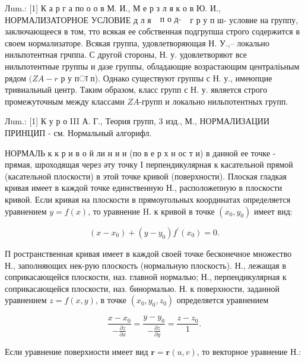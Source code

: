 \documentclass[10pt]{article}
\begin{document}
Лum.: [1] К а р г а по о о в М. И., М е р з л я к о в Ю. И., НОРМАЛИЗАТОРНОЕ УСЛОВИЕ д л я $\begin{array}{r}\text { п } о \text { д- }\end{array}$ г р у п ш- условие на группу, заключающееся в том, тто всякая ее собственная подгрупша строго содержится в своем нормализаторе. Всякая группа, удовлетворяющая Н. У.,-- локально нильпотентная грчппа. С другой стороны, Н. у. удовлетворяют все нильпотентные группы и дазе группы, обладающие возрастающим централіьным рядом $(Z A-r$ р у пा п). Однако существуют группы с Н. у., имеюпцие тривиальный центр. Таким образом, класс групп с Н. у. является строго промежуточным между классами $Z A$-групп и локально нильпотентных групп.



Лum.: [1] К у р о III А. Г., Теория групп, 3 изд., М., НОРМАЛИЗАЦИИ ПРИНЦИП - см. Нормальный алгорифл.



НОРМАЛЬ к к р и в о й ли н и и (по в е р х н ос т и) в данной ее точке - прямая, шроходящая через әту точку І перпендикулярная к касательной прямой (касательной плоскости) в этой точке кривой (поверхности). Плоская гладкая кривая имеет в каждой точке единственную Н., расположепную в плоскости кривой. Если кривая на плоскости в прямоугольных координатах определяется уравнением $y=f(x)$, то уравнение $\mathrm{H}$. к кривой в точке $\left(x_{0}, y_{0}\right)$ имеет вид:



\[

\left(x-x_{0}\right)+\left(y-y_{0}\right) f^{\prime}\left(x_{0}\right)=0 .

\]



П ространственная кривая имеет в каждой своей точке бесконечное множество Н., заполняющих нек-рую плоскость (нормальную плоскость). Н., лежащая в соприкасающейся плоскости, наз. главной нормалью; Н., перпендикулярная к соприкасающейся плоскости, наз. бинормалью. Н. к поверхности, заданной уравнением $z=f(x, y)$, в точке $\left(x_{0}, y_{0}, z_{0}\right)$ определяется уравнением



\[

\frac{x-x_{0}}{-\frac{\partial z}{\partial x}}=\frac{y-y_{0}}{-\frac{\partial z}{\partial y}}=\frac{z-z_{0}}{1} .

\]



Если уравнение поверхности имеет вид $\boldsymbol{r}=\boldsymbol{r}(u, v)$, то векторное уравнение Н.:
\end{document}
